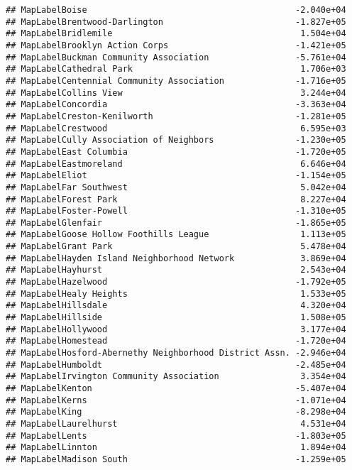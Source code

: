 \documentclass[]{article}
\begin{document}
\begin{verbatim}
## MapLabelBoise                                         -2.040e+04
## MapLabelBrentwood-Darlington                          -1.827e+05
## MapLabelBridlemile                                     1.504e+04
## MapLabelBrooklyn Action Corps                         -1.421e+05
## MapLabelBuckman Community Association                 -5.761e+04
## MapLabelCathedral Park                                 1.706e+03
## MapLabelCentennial Community Association              -1.716e+05
## MapLabelCollins View                                   3.244e+04
## MapLabelConcordia                                     -3.363e+04
## MapLabelCreston-Kenilworth                            -1.281e+05
## MapLabelCrestwood                                      6.595e+03
## MapLabelCully Association of Neighbors                -1.230e+05
## MapLabelEast Columbia                                 -1.720e+05
## MapLabelEastmoreland                                   6.646e+04
## MapLabelEliot                                         -1.154e+05
## MapLabelFar Southwest                                  5.042e+04
## MapLabelForest Park                                    8.227e+04
## MapLabelFoster-Powell                                 -1.310e+05
## MapLabelGlenfair                                      -1.865e+05
## MapLabelGoose Hollow Foothills League                  1.113e+05
## MapLabelGrant Park                                     5.478e+04
## MapLabelHayden Island Neighborhood Network             3.869e+04
## MapLabelHayhurst                                       2.543e+04
## MapLabelHazelwood                                     -1.792e+05
## MapLabelHealy Heights                                  1.533e+05
## MapLabelHillsdale                                      4.320e+04
## MapLabelHillside                                       1.508e+05
## MapLabelHollywood                                      3.177e+04
## MapLabelHomestead                                     -1.720e+04
## MapLabelHosford-Abernethy Neighborhood District Assn. -2.946e+04
## MapLabelHumboldt                                      -2.485e+04
## MapLabelIrvington Community Association                3.354e+04
## MapLabelKenton                                        -5.407e+04
## MapLabelKerns                                         -1.071e+04
## MapLabelKing                                          -8.298e+04
## MapLabelLaurelhurst                                    4.531e+04
## MapLabelLents                                         -1.803e+05
## MapLabelLinnton                                        1.894e+04
## MapLabelMadison South                                 -1.259e+05

\end{verbatim}
\end{document}
